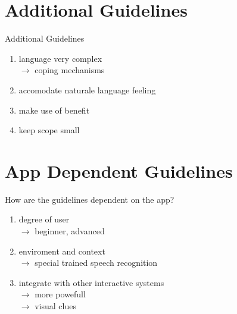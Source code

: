 \documentclass[
  10pt
, handout
]{beamer}
\begin{document}
\section{Additional Guidelines}  %

\begin{frame}{Additional Guidelines}
 \begin{enumerate}
  \item<+-> {language very complex} \\
            $\rightarrow$ coping mechanisms

  \item<+-> {accomodate naturale language feeling}
  \item<+-> {make use of benefit}

  \item<+-> {keep scope small}
 \end{enumerate}
\end{frame}

\section{App Dependent Guidelines}  %

\begin{frame}{How are the guidelines dependent on the app?}
  \begin{enumerate}
    \item<+-> {degree of user} \\
               $\rightarrow$ beginner, advanced
    \item<+-> {enviroment and context} \\
               $\rightarrow$ special trained speech recognition             
    \item<+-> {integrate with other interactive systems} \\
               $\rightarrow$ more powefull \\         
               $\rightarrow$ visual clues
  \end{enumerate}
\end{frame}
\end{document}
